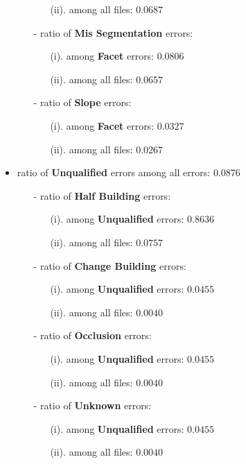 \documentclass[a4paper, 11pt]{article}
\begin{document}
\begin{itemize}
\begin{itemize}
\begin{itemize}
				\item[(ii).] among all files:   $0.0687$
			\end{itemize}
			\item[-] ratio of \textbf{Mis Segmentation} errors:
			\begin{itemize}
				\item[(i).] among \textbf{Facet} errors:  $0.0806$
				\item[(ii).] among all files:  $0.0657$
			\end{itemize}
			\item[-] ratio of \textbf{Slope} errors:
			\begin{itemize}
				\item[(i).] among \textbf{Facet} errors:  $0.0327$
				\item[(ii).] among all files:  $0.0267$
			\end{itemize}
		\end{itemize}
		\item ratio of \textbf{Unqualified} errors among all errors: $0.0876$
		\begin{itemize}
			\item[-] ratio of \textbf{Half Building} errors:
			\begin{itemize}
				\item[(i).] among \textbf{Unqualified} errors:  $0.8636$
				\item[(ii).] among all files:  $0.0757$
			\end{itemize}
			\item[-] ratio of \textbf{Change Building} errors:
			\begin{itemize}
				\item[(i).] among \textbf{Unqualified} errors:  $0.0455$
				\item[(ii).] among all files:   $0.0040$
			\end{itemize}
			\item[-] ratio of \textbf{Occlusion} errors:
			\begin{itemize}
				\item[(i).] among \textbf{Unqualified} errors:  $0.0455$
				\item[(ii).] among all files:  $0.0040$
			\end{itemize}
			\item[-] ratio of \textbf{Unknown} errors:
			\begin{itemize}
				\item[(i).] among \textbf{Unqualified} errors:   $0.0455$
				\item[(ii).] among all files:  $0.0040$
			\end{itemize}
		\end{itemize}
	\end{itemize}
\end{document}
